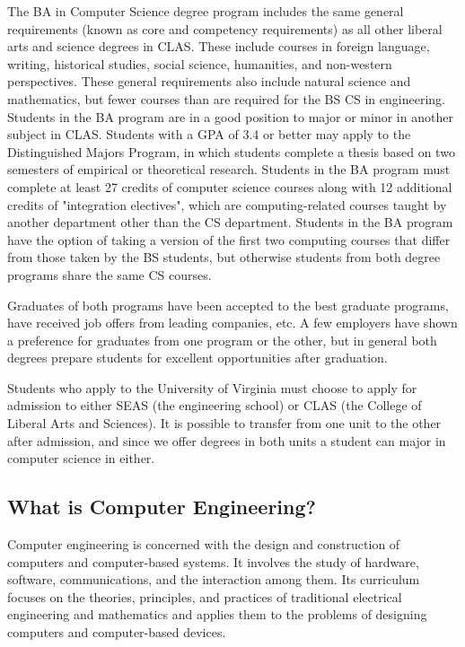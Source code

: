 The BA in Computer Science degree program includes the same general
requirements (known as core and competency requirements) as all other
liberal arts and science degrees in CLAS. These include courses in
foreign language, writing, historical studies, social science,
humanities, and non-western perspectives. These general requirements
also include natural science and mathematics, but fewer courses than
are required for the BS CS in engineering. Students in the BA program
are in a good position to major or minor in another subject in
CLAS. Students with a GPA of 3.4 or better may apply to the
Distinguished Majors Program, in which students complete a thesis
based on two semesters of empirical or theoretical research. Students
in the BA program must complete at least 27 credits of computer
science courses along with 12 additional credits of "integration
electives", which are computing-related courses taught by another
department other than the CS department. Students in the BA program
have the option of taking a version of the first two computing courses
that differ from those taken by the BS students, but otherwise
students from both degree programs share the same CS courses.

Graduates of both programs have been accepted to the best graduate
programs, have received job offers from leading companies, etc. A few
employers have shown a preference for graduates from one program or
the other, but in general both degrees prepare students for excellent
opportunities after graduation.

Students who apply to the University of Virginia must choose to apply
for admission to either SEAS (the engineering school) or CLAS (the
College of Liberal Arts and Sciences). It is possible to transfer from
one unit to the other after admission, and since we offer degrees in
both units a student can major in computer science in either.

\subsection{What is Computer Engineering?}

Computer engineering is concerned with the design and construction of
computers and computer-based systems. It involves the study of
hardware, software, communications, and the interaction among
them. Its curriculum focuses on the theories, principles, and
practices of traditional electrical engineering and mathematics and
applies them to the problems of designing computers and computer-based
devices.

